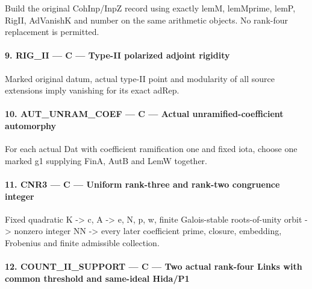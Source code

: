 \documentclass[11pt,a4paper]{article}
\numberwithin{equation}{section}
\theoremstyle{remark}\newtheorem{remark}[theorem]{Remark}
\begin{document}
Build the original CohInp/\allowbreak{}InpZ record using exactly lemM,\allowbreak{} lemMprime,\allowbreak{} lemP,\allowbreak{} RigII,\allowbreak{} AdVanishK and number on the same arithmetic objects. No rank-four replacement is permitted.


\paragraph{9. RIG\_\allowbreak{}II — C — Type-II polarized adjoint rigidity}

Marked original datum, actual type-II point and modularity of all source extensions imply vanishing for its exact adRep.


\paragraph{10. AUT\_\allowbreak{}UNRAM\_\allowbreak{}COEF — C — Actual unramified-coefficient automorphy}

For each actual Dat with coefficient ramification one and fixed iota, choose one marked g1 supplying FinA, AutB and LemW together.


\paragraph{11. CNR3 — C — Uniform rank-three and rank-two congruence integer}

Fixed quadratic K -> c,\allowbreak{} A -> e,\allowbreak{} N,\allowbreak{} p,\allowbreak{} w,\allowbreak{} finite Galois-stable roots-of-unity orbit -> nonzero integer NN -> every later coefficient prime, closure, embedding, Frobenius and finite admissible collection.


\paragraph{12. COUNT\_\allowbreak{}II\_\allowbreak{}SUPPORT — C — Two actual rank-four Links with common threshold and same-ideal Hida/\allowbreak{}P1}
\end{document}

